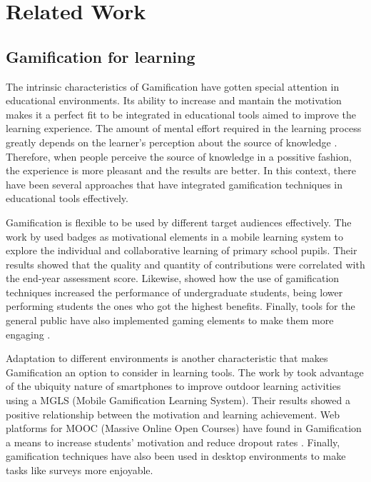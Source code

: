 
\chapter{Related Work} %

\label{rela} %


\section{Gamification for learning}
The intrinsic characteristics of Gamification have gotten special attention in educational environments. Its ability to increase and mantain the motivation makes it a perfect fit to be integrated in educational tools aimed to improve the learning experience. The amount of mental effort required in the learning process greatly depends on the learner's perception about the source of knowledge \citep{salomon1983differential}. Therefore, when people perceive the source of knowledge in a possitive fashion, the experience is more pleasant and the results are better. In this context, there have been several approaches that have integrated gamification techniques in educational tools effectively.

Gamification is flexible to be used by different target audiences effectively. The work by \citep{boticki2015usage} used badges as motivational elements in a mobile learning system to explore the individual and collaborative learning of primary school pupils. Their results showed that the quality and quantity of contributions were correlated with the end-year assessment score. Likewise, \citep{slish2015gamification} showed how the use of gamification techniques increased the performance of undergraduate students, being lower performing students the ones who got the highest benefits. Finally, tools for the general public have also implemented gaming elements to make them more engaging \citep{morrison2014khan}.

Adaptation to different environments is another characteristic that makes Gamification an option to consider in learning tools. The work by \citep{su2015mobile} took advantage of the ubiquity nature of smartphones to improve outdoor learning activities using a MGLS (Mobile Gamification Learning System). Their results showed a positive relationship between the motivation and learning achievement. Web platforms for MOOC (Massive Online Open Courses) have found in Gamification a means to increase students' motivation and reduce dropout rates \citep{gene2014gamification}. Finally, gamification techniques have also been used in desktop environments to make tasks like surveys more enjoyable\citep{cheong2013quick}.

